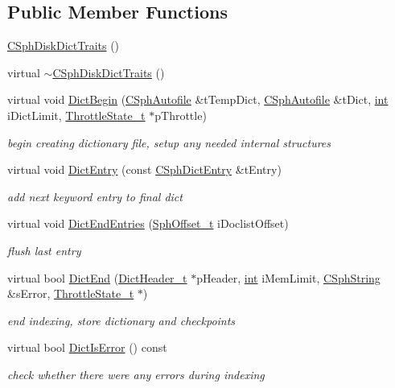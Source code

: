 \subsection*{Public Member Functions}
\begin{DoxyCompactItemize}
\item 
\hyperlink{structCSphDiskDictTraits_a69d7a88ec23a22354b28b31e90f9e4d1}{C\-Sph\-Disk\-Dict\-Traits} ()
\item 
virtual \hyperlink{structCSphDiskDictTraits_a86d0f2bfa07eb7fcf43c93aa1495c0c8}{$\sim$\-C\-Sph\-Disk\-Dict\-Traits} ()
\item 
virtual void \hyperlink{structCSphDiskDictTraits_a5d01013f2caeddf6e0f76574bfd78ffb}{Dict\-Begin} (\hyperlink{classCSphAutofile}{C\-Sph\-Autofile} \&t\-Temp\-Dict, \hyperlink{classCSphAutofile}{C\-Sph\-Autofile} \&t\-Dict, \hyperlink{sphinxexpr_8cpp_a4a26e8f9cb8b736e0c4cbf4d16de985e}{int} i\-Dict\-Limit, \hyperlink{structThrottleState__t}{Throttle\-State\-\_\-t} $\ast$p\-Throttle)
\begin{DoxyCompactList}\small\item\em begin creating dictionary file, setup any needed internal structures \end{DoxyCompactList}\item 
virtual void \hyperlink{structCSphDiskDictTraits_ad5b4cf8ac8c387aa2e56e3122efce9b0}{Dict\-Entry} (const \hyperlink{structCSphDictEntry}{C\-Sph\-Dict\-Entry} \&t\-Entry)
\begin{DoxyCompactList}\small\item\em add next keyword entry to final dict \end{DoxyCompactList}\item 
virtual void \hyperlink{structCSphDiskDictTraits_a9bca14c2361261d754784c2164965b9f}{Dict\-End\-Entries} (\hyperlink{sphinx_8h_a0fb3b64afebef33c61367714754eaa90}{Sph\-Offset\-\_\-t} i\-Doclist\-Offset)
\begin{DoxyCompactList}\small\item\em flush last entry \end{DoxyCompactList}\item 
virtual bool \hyperlink{structCSphDiskDictTraits_af64e1b88d97caf649a6503310a513755}{Dict\-End} (\hyperlink{structDictHeader__t}{Dict\-Header\-\_\-t} $\ast$p\-Header, \hyperlink{sphinxexpr_8cpp_a4a26e8f9cb8b736e0c4cbf4d16de985e}{int} i\-Mem\-Limit, \hyperlink{structCSphString}{C\-Sph\-String} \&s\-Error, \hyperlink{structThrottleState__t}{Throttle\-State\-\_\-t} $\ast$)
\begin{DoxyCompactList}\small\item\em end indexing, store dictionary and checkpoints \end{DoxyCompactList}\item 
virtual bool \hyperlink{structCSphDiskDictTraits_ae23188eb87d7bc16a37f33688a1083bc}{Dict\-Is\-Error} () const 
\begin{DoxyCompactList}\small\item\em check whether there were any errors during indexing \end{DoxyCompactList}\end{DoxyCompactItemize}
